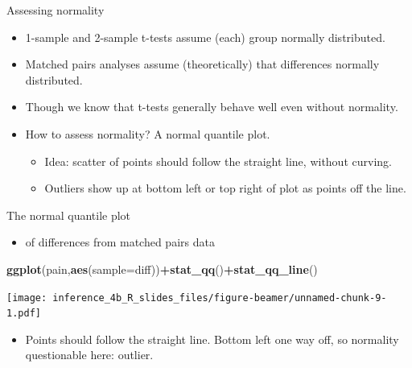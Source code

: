 \documentclass[
  ignorenonframetext,
]{beamer}
\newenvironment{Shaded}{\begin{snugshade}}{\end{snugshade}}
\newcommand{\DataTypeTok}[1]{\textcolor[rgb]{0.13,0.29,0.53}{#1}}
\newcommand{\KeywordTok}[1]{\textcolor[rgb]{0.13,0.29,0.53}{\textbf{#1}}}
\newcommand{\NormalTok}[1]{#1}
\newcommand{\OperatorTok}[1]{\textcolor[rgb]{0.81,0.36,0.00}{\textbf{#1}}}
\providecommand{\tightlist}{%
  \setlength{\itemsep}{0pt}\setlength{\parskip}{0pt}}
\begin{document}
\begin{frame}{Assessing normality}
\protect\hypertarget{assessing-normality}{}
\begin{itemize}
\tightlist
\item
  1-sample and 2-sample t-tests assume (each) group normally
  distributed.
\item
  Matched pairs analyses assume (theoretically) that differences
  normally distributed.
\item
  Though we know that t-tests generally behave well even without
  normality.
\item
  How to assess normality? A normal quantile plot.

  \begin{itemize}
  \tightlist
  \item
    Idea: scatter of points should follow the straight line, without
    curving.
  \item
    Outliers show up at bottom left or top right of plot as points off
    the line.
  \end{itemize}
\end{itemize}
\end{frame}

\begin{frame}[fragile]{The normal quantile plot}
\protect\hypertarget{the-normal-quantile-plot}{}
\begin{itemize}
\tightlist
\item
  of differences from matched pairs data
\end{itemize}

\begin{Shaded}
\begin{Highlighting}[]
\KeywordTok{ggplot}\NormalTok{(pain,}\KeywordTok{aes}\NormalTok{(}\DataTypeTok{sample=}\NormalTok{diff))}\OperatorTok{+}\KeywordTok{stat\_qq}\NormalTok{()}\OperatorTok{+}\KeywordTok{stat\_qq\_line}\NormalTok{()}
\end{Highlighting}
\end{Shaded}

\texttt{[image: inference\_4b\_R\_slides\_files/figure-beamer/unnamed-chunk-9-1.pdf]}

\begin{itemize}
\tightlist
\item
  Points should follow the straight line. Bottom left one way off, so
  normality questionable here: outlier.
\end{itemize}
\end{frame}
\end{document}
